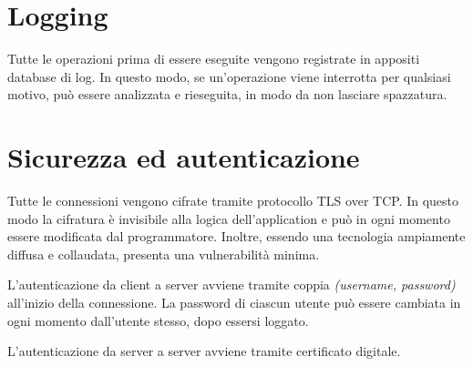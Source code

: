 \documentclass{article}
\begin{document}
\section{Logging}

Tutte le operazioni prima di essere eseguite vengono registrate in appositi database di log. In questo modo, se un'operazione viene interrotta per qualsiasi motivo, può essere analizzata e rieseguita, in modo da non lasciare spazzatura. 





\section{Sicurezza ed autenticazione}

Tutte le connessioni vengono cifrate tramite protocollo TLS over TCP. In questo modo la cifratura è invisibile alla logica dell'application e può in ogni momento essere modificata dal programmatore. Inoltre, essendo una tecnologia ampiamente diffusa e collaudata, presenta una vulnerabilità minima. 

L'autenticazione da client a server avviene tramite coppia \textit{(username, password)} all'inizio della connessione. La password di ciascun utente può essere cambiata in ogni momento dall'utente stesso, dopo essersi loggato. 

L'autenticazione da server a server avviene tramite certificato digitale. 






\end{document}
